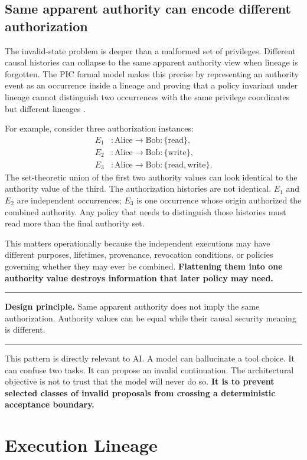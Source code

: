 \documentclass[10pt,oneside,openany]{book}
\newcommand{\principle}[1]{%
  \vspace{4pt}
  \noindent\begin{minipage}{\linewidth}
  \hrule\vspace{5pt}
  \small\sffamily\raggedright\textbf{Design principle.} #1
  \vspace{5pt}\hrule
  \end{minipage}\vspace{4pt}
}
\begin{document}
\section{Same apparent authority can encode different authorization}
The invalid-state problem is deeper than a malformed set of privileges. Different causal histories can collapse to the same apparent authority view when lineage is forgotten. The PIC formal model makes this precise by representing an authority event as an occurrence inside a lineage and proving that a policy invariant under lineage cannot distinguish two occurrences with the same privilege coordinates but different lineages \cite{gallo2026pic}.

For example, consider three authorization instances:
\[
\begin{aligned}
E_1 &: \text{Alice} \rightarrow \text{Bob}: \{\mathrm{read}\},\\
E_2 &: \text{Alice} \rightarrow \text{Bob}: \{\mathrm{write}\},\\
E_3 &: \text{Alice} \rightarrow \text{Bob}: \{\mathrm{read},\mathrm{write}\}.
\end{aligned}
\]
The set-theoretic union of the first two authority values can look identical to the authority value of the third. The authorization histories are not identical. $E_1$ and $E_2$ are independent occurrences; $E_3$ is one occurrence whose origin authorized the combined authority. Any policy that needs to distinguish those histories must read more than the final authority set.

This matters operationally because the independent executions may have different purposes, lifetimes, provenance, revocation conditions, or policies governing whether they may ever be combined. \textbf{Flattening them into one authority value destroys information that later policy may need.}

\principle{Same apparent authority does not imply the same authorization. Authority values can be equal while their causal security meaning is different.}

This pattern is directly relevant to AI. A model can hallucinate a tool choice. It can confuse two tasks. It can propose an invalid continuation. The architectural objective is not to trust that the model will never do so. \textbf{It is to prevent selected classes of invalid proposals from crossing a deterministic acceptance boundary.}

\chapter{Execution Lineage}
\end{document}

